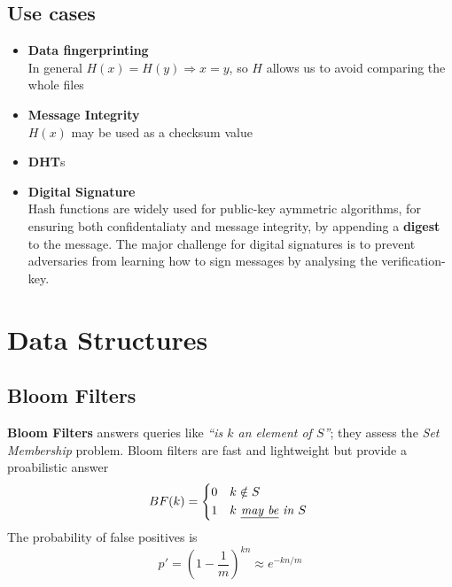 \subsection{Use cases}
\begin{itemize}
   \item \textbf{Data fingerprinting}\\
   In general $H(x) = H(y) \Rightarrow x = y$, so $H$ allows us to avoid comparing the whole files
   \item \textbf{Message Integrity}\\
   $H(x)$ may be used as a checksum value
   \item \textbf{DHT}s
   \item \textbf{Digital Signature}\\
   Hash functions are widely used for public-key aymmetric algorithms, for ensuring both confidentaliaty and message integrity, by appending a \textbf{digest} to the message.
   The major challenge for digital signatures is to prevent adversaries from learning how to sign messages by analysing the verification-key.
   
\end{itemize}



\section{Data Structures}

\subsection{Bloom Filters}
\textbf{Bloom Filters} answers queries like \textit{``is $k$ an element of $S$''}; they assess the \textit{Set Membership} problem. Bloom filters are fast and lightweight but provide a proabilistic answer
\begin{equation}
   BF(k) = 
   \begin{cases*}
      $0$ & $k \notin S$\\
      $1$ & $k \textit{ \ul{may be} in } S$  
   \end{cases*}   
\end{equation}
The probability of false positives is
\begin{equation*}
   p' = \left( 1 - \frac{1}{m}\right) ^{kn} \approx e^{-kn/m}
\end{equation*}

